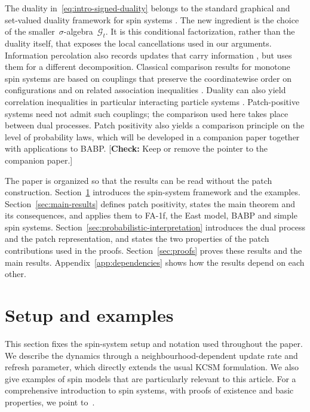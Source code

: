 \documentclass[EJP,preprint,NODS,nobera]{ejpecp}
\newcommand{\chg}[1]{{\color{changegreen}#1}}
\newcommand{\authorcheck}[1]{{\color{blue}[\textbf{Check:} #1]}}
\begin{document}
The duality in~\eqref{eq:intro-signed-duality} belongs to the standard
graphical and set-valued duality framework for spin systems
\cite{Harris1974,Harris1978,Griffeath1979,HolleyStroock1979,Gray1986,JansenKurt2014}.
The new ingredient is the choice of the smaller~$\sigma$-algebra~$\mathcal G_t$.
It is this conditional factorization, rather than the duality itself, that
exposes the local cancellations used in our arguments. Information
percolation also records updates that carry information
\cite{LubetzkySly2016}, but uses them for a different decomposition.
Classical comparison results for monotone spin systems are based on couplings
that preserve the coordinatewise order on configurations and on related
association inequalities \cite{Harris1977,Liggett1985,Liggett2006}. Duality
can also yield correlation inequalities in particular interacting particle
systems \cite{GiardinaRedigVafayi2010}. Patch-positive systems need not admit
such couplings; the comparison used here takes place between dual processes.
Patch positivity also yields a comparison principle on the level of
probability laws, which will be developed in a companion paper together with
applications to BABP. \authorcheck{Keep or remove the pointer to the
companion paper.}

The paper is organized so that the results can be read without the patch
construction. Section~\ref{sec:setup} introduces the spin-system framework
and the examples. Section~\ref{sec:main-results} defines patch positivity,
states the main theorem and its consequences, and applies them to FA-1f, the
East model, BABP and simple spin systems.
\chg{Section~\ref{sec:probabilistic-interpretation} introduces the dual process
and the patch representation, and states the two properties of the patch
contributions used in the proofs. Section~\ref{sec:proofs} proves these
results and the main results.} Appendix~\ref{app:dependencies} shows how the
results depend on each other.

\section{Setup and examples}
\label{sec:setup}

This section fixes the spin-system setup and notation used throughout the paper.
We describe the dynamics through a neighbourhood-dependent update rate and
refresh parameter, which directly extends the usual KCSM formulation. We also give examples of spin models that are particularly relevant to this article. For a comprehensive introduction to spin systems, with proofs of existence and basic properties, we point to~\cite{Liggett1985}.
\end{document}
